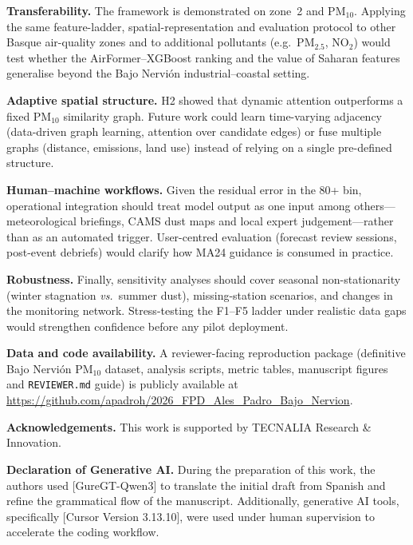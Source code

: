 \documentclass[11pt]{article}
\newcommand{\revnew}[1]{\textcolor{orange!75!black}{#1}}
\begin{document}
\revnew{\textbf{Transferability.} The framework is demonstrated on zone~2 and PM$_{10}$. Applying the same feature-ladder, spatial-representation and evaluation protocol to other Basque air-quality zones and to additional pollutants (e.g.\ PM$_{2.5}$, NO$_2$) would test whether the AirFormer--XGBoost ranking and the value of Saharan features generalise beyond the Bajo Nervi\'on industrial--coastal setting.}

\revnew{\textbf{Adaptive spatial structure.} H2 showed that dynamic attention outperforms a fixed PM$_{10}$ similarity graph. Future work could learn time-varying adjacency (data-driven graph learning, attention over candidate edges) or fuse multiple graphs (distance, emissions, land use) instead of relying on a single pre-defined structure.}

\revnew{\textbf{Human--machine workflows.} Given the residual error in the 80+ bin, operational integration should treat model output as one input among others---meteorological briefings, CAMS dust maps and local expert judgement---rather than as an automated trigger. User-centred evaluation (forecast review sessions, post-event debriefs) would clarify how MA24 guidance is consumed in practice.}

\revnew{\textbf{Robustness.} Finally, sensitivity analyses should cover seasonal non-stationarity (winter stagnation \emph{vs.}\ summer dust), missing-station scenarios, and changes in the monitoring network. Stress-testing the F1--F5 ladder under realistic data gaps would strengthen confidence before any pilot deployment.}

\vspace{1em}
\noindent\revnew{\textbf{Data and code availability.} A reviewer-facing reproduction package (definitive Bajo Nervi\'on PM$_{10}$ dataset, analysis scripts, metric tables, manuscript figures and \texttt{REVIEWER.md} guide) is publicly available at \url{https://github.com/apadroh/2026_FPD_Ales_Padro_Bajo_Nervion}.}

\vspace{0.5em}
\noindent\textbf{Acknowledgements.} This work is supported by TECNALIA Research \& Innovation.

\noindent\textbf{Declaration of Generative AI.} During the preparation of this work, the authors used [GureGT-Qwen3] to translate the initial draft from Spanish and refine the grammatical flow of the manuscript. Additionally, generative AI tools, specifically [Cursor Version 3.13.10], were used under human supervision to accelerate the coding workflow.
\end{document}
